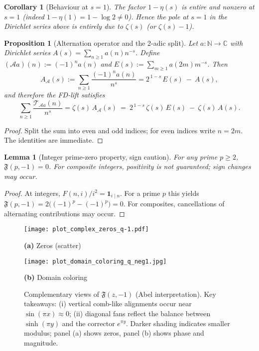 \documentclass[11pt,a4paper]{amsart}
\newcommand{\C}{\mathbb{C}}
\newcommand{\N}{\mathbb{N}}
\theoremstyle{plain}
\newtheorem{lemma}[theorem]{Lemma}
\newtheorem{proposition}[theorem]{Proposition}
\newtheorem{corollary}[theorem]{Corollary}
\theoremstyle{definition}
\theoremstyle{remark}
\begin{document}
\begin{corollary}[Behaviour at \(s=1\)]\label{cor:qminus1-s1}
The factor \(1-\eta(s)\) is entire and nonzero at \(s=1\) (indeed \(1-\eta(1)=1-\log2\neq0\)).
Hence the pole at \(s=1\) in the Dirichlet series above is entirely due to \(\zeta(s)\) (or \(\zeta(s)-1\)).
\end{corollary}

\begin{proposition}[Alternation operator and the 2-adic split]\label{prop:alternation-operator}
Let \(a:\N\to\C\) with Dirichlet series \(A(s)=\sum_{n\ge1}a(n)n^{-s}\). Define \((\mathcal A a)(n):=(-1)^n a(n)\) and \(E(s):=\sum_{m\ge1}a(2m)m^{-s}\).
Then
\[
A_{\mathcal A}(s):=\sum_{n\ge1}\frac{(-1)^n a(n)}{n^s}
= 2^{\,1-s}\,E(s)\ -\ A(s),
\]
and therefore the FD-lift satisfies
\[
\sum_{n\ge1}\frac{\mathcal T_{\mathcal A a}(n)}{n^s}
=\zeta(s)\,A_{\mathcal A}(s)\ =\ 2^{\,1-s}\,\zeta(s)\,E(s)\ -\ \zeta(s)\,A(s).
\]
\end{proposition}


\begin{proof}
Split the sum into even and odd indices; for even indices write \(n=2m\). The identities are immediate.
\end{proof}

\begin{lemma}[Integer prime-zero property, sign caution]\label{lem:qminus1-prime-zero}
For any prime \(p\ge2\),
\(\mathfrak F(p,-1)=0\).
For composite integers, positivity is not guaranteed; sign changes may occur.
\end{lemma}

\begin{proof}
At integers, \(F(n,i)/i^2=\mathbf 1_{i\mid n}\). For a prime \(p\) this yields
\(\mathfrak F(p,-1)=2\bigl((-1)^p-(-1)^p\bigr)=0\).
For composites, cancellations of alternating contributions may occur.
\end{proof}

\begin{figure}[!htbp]
\centering
\begin{minipage}[t]{0.49\textwidth}
\centering
\texttt{[image: plot\_complex\_zeros\_q-1.pdf]}
\par\smallskip\small\textbf{(a)} Zeros (scatter)
\label{fig:complex_zeros_qminus1}
\end{minipage}\hfill
\begin{minipage}[t]{0.49\textwidth}
\centering
\texttt{[image: plot\_domain\_coloring\_q\_neg1.jpg]}
\par\small\textbf{(b)} Domain coloring
\label{fig:domain_coloring_qminus1}
\end{minipage}
\caption{Complementary views of $\mathfrak{F}(z,-1)$ (Abel interpretation). Key takeaways: (i) vertical comb-like alignments occur near $\sin(\pi x)\approx 0$; (ii) diagonal fans reflect the balance between $\sinh(\pi y)$ and the corrector $e^{\pi y}$. Darker shading indicates smaller modulus; panel (a) shows zeros, panel (b) shows phase and magnitude.}
\end{figure}
\end{document}
